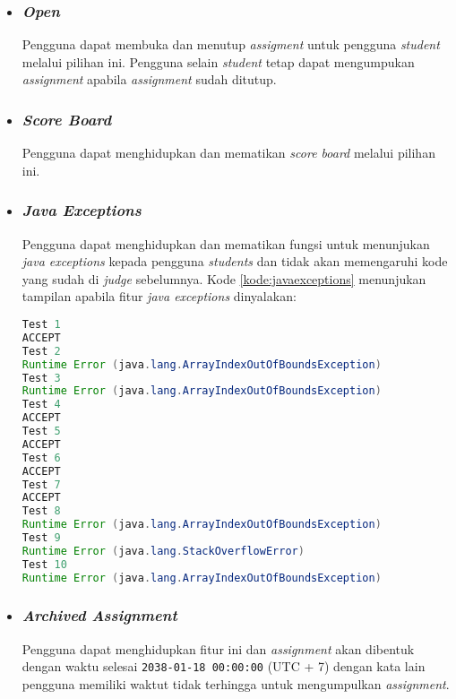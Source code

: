 \begin{itemize}
\item \subsubsection{\textit{Open}}
Pengguna dapat membuka dan menutup \textit{assigment} untuk pengguna \textit{student} melalui pilihan ini. Pengguna selain \textit{student} tetap dapat mengumpukan \textit{assignment} apabila \textit{assignment} sudah ditutup.

\item \subsubsection{\textit{Score Board}}
Pengguna dapat menghidupkan dan mematikan \textit{score board} melalui pilihan ini.

\item \subsubsection{\textit{Java Exceptions}}
Pengguna dapat menghidupkan dan mematikan fungsi untuk menunjukan \textit{java exceptions} kepada pengguna \textit{students} dan tidak akan memengaruhi kode yang sudah di \textit{judge} sebelumnya. Kode \ref{kode:javaexceptions} menunjukan tampilan apabila fitur \textit{java exceptions} dinyalakan:
\begin{lstlisting}[language=Java, caption=Contoh tampilan fitur \textit{Java Exceptions}, label=kode:javaexceptions]
Test 1
ACCEPT
Test 2
Runtime Error (java.lang.ArrayIndexOutOfBoundsException)
Test 3
Runtime Error (java.lang.ArrayIndexOutOfBoundsException)
Test 4
ACCEPT
Test 5
ACCEPT
Test 6
ACCEPT
Test 7
ACCEPT
Test 8
Runtime Error (java.lang.ArrayIndexOutOfBoundsException)
Test 9
Runtime Error (java.lang.StackOverflowError)
Test 10
Runtime Error (java.lang.ArrayIndexOutOfBoundsException)
\end{lstlisting}

\item \subsubsection{\textit{Archived Assignment}}
Pengguna dapat menghidupkan fitur ini dan \textit{assignment} akan dibentuk dengan waktu selesai \verb|2038-01-18 00:00:00| (UTC + 7) dengan kata lain pengguna memiliki waktut tidak terhingga untuk mengumpulkan \textit{assignment}.


\end{itemize}
